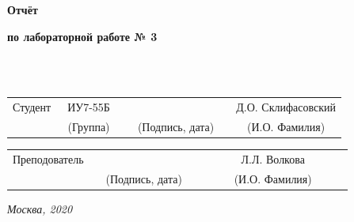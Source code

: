\documentclass[12pt]{report}
\begin{document}
\begin{titlepage}
		
		\begin{center}
			\vspace{3cm}
			{\bf\huge Отчёт\par}
			{\bf\Large по лабораторной работе № 3\par}
			\vspace{0.5cm}
		\end{center}
		
		
		\noindent
		\\
		
		\noindent
		\\
		
		\vspace{1.5cm}
		\noindent
		\begin{tabular}{l c c c c c}
			Студент      & ~ИУ7-55Б~               & \hspace{3.5cm} & \hspace{3.5cm}                 & &  Д.О. Склифасовский \\\cline{2-2}\cline{4-4} \cline{6-6} 
			\hspace{3cm} & {\footnotesize(Группа)} &                & {\footnotesize(Подпись, дата)} & & {\footnotesize(И.О. Фамилия)}
		\end{tabular}
		
		\vspace{1cm}
		
		\noindent
		\begin{tabular}{l c c c c}
			Преподователь & \hspace{6cm}   & \hspace{3.5cm}                 & & ~~~~~~ Л.Л. Волкова ~~~~~~\\\cline{3-3} \cline{5-5} 
			\hspace{3cm}  &                & {\footnotesize(Подпись, дата)} & & {\footnotesize(И.О. Фамилия)}
		\end{tabular}
		
		\begin{center}	
			\vfill
			\large \textit {Москва, 2020}
		\end{center}
		
		\thispagestyle {empty}
		\pagebreak
	\end{titlepage}
	\restoregeometry
	
	\tableofcontents
	\onehalfspacing
	\newpage
\end{document}
